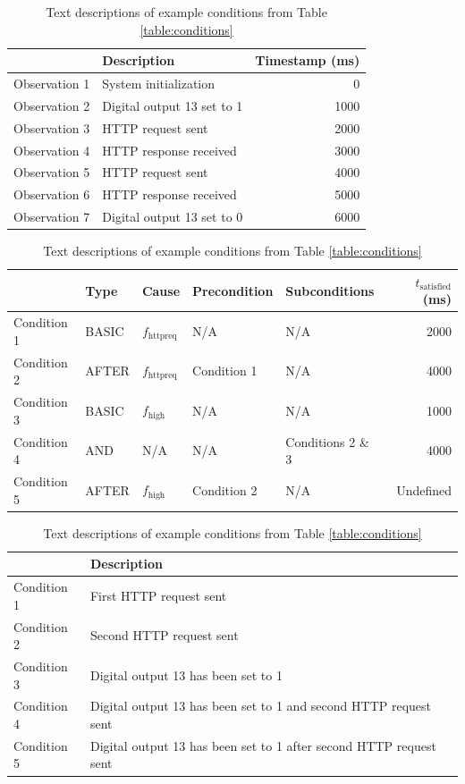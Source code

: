 \documentclass[12pt]{article}
\begin{document}
\begin{table}[ht]
\begin{center}
\caption{Example observations}
\label{table:observations}
\begin{tabular}{l|lr}
& Description & Timestamp (ms) \\ \hline
Observation 1 & System initialization & 0 \\
Observation 2 & Digital output 13 set to 1 & 1000 \\
Observation 3 & HTTP request sent & 2000 \\
Observation 4 & HTTP response received & 3000 \\
Observation 5 & HTTP request sent & 4000 \\
Observation 6 & HTTP response received & 5000 \\
Observation 7 & Digital output 13 set to 0 & 6000 \\ \hline
\end{tabular}

\vspace{5mm}

\caption{Example conditions, with $t_{\text{satisfied}}$ calculated with respect to Table \ref{table:observations}}
\label{table:conditions}

\begin{tabular}{l|llllr}
& Type & Cause & Precondition & Subconditions & $t_{\text{satisfied}}$ (ms) \\ \hline
Condition 1 & BASIC & $f_{\text{httpreq}}$ & N/A & N/A & 2000 \\
Condition 2 & AFTER & $f_{\text{httpreq}}$ & Condition 1 & N/A & 4000 \\
Condition 3 & BASIC & $f_{\text{high}}$ & N/A & N/A & 1000 \\
Condition 4 & AND & N/A & N/A & Conditions 2 \& 3 & 4000 \\
Condition 5 & AFTER & $f_{\text{high}}$ & Condition 2 & N/A & Undefined \\ \hline
\end{tabular}

\vspace{5mm}

\caption{Text descriptions of example conditions from Table \ref{table:conditions}}
\label{table:condition-descs}

\begin{tabular}{l|l}
& Description \\ \hline
Condition 1 & First HTTP request sent \\
Condition 2 & Second HTTP request sent \\
Condition 3 & Digital output 13 has been set to 1 \\
Condition 4 & Digital output 13 has been set to 1 and second HTTP request sent \\
Condition 5 & Digital output 13 has been set to 1 after second HTTP request sent \\ \hline
\end{tabular}
\end{center}
\end{table}
\end{document}
